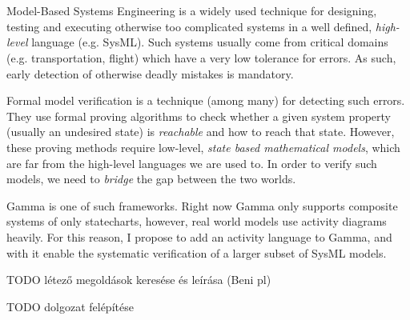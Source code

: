 \chapter{\bevezetes}

Model-Based Systems Engineering is a widely used technique for designing, testing and executing otherwise too complicated systems in a well defined, \emph{high-level} language (e.g. SysML). Such systems usually come from critical domains (e.g. transportation, flight) which have a very low tolerance for errors. As such, early detection of otherwise deadly mistakes is mandatory.

Formal model verification is a technique (among many) for detecting such errors. They use formal proving algorithms to check whether a given system property (usually an undesired state) is \emph{reachable} and how to reach that state. However, these proving methods require low-level, \emph{state based mathematical models}, which are far from the high-level languages we are used to. In order to verify such models, we need to \emph{bridge} the gap between the two worlds.

Gamma is one of such frameworks. Right now Gamma only supports composite systems of only statecharts, however, real world models use activity diagrams heavily. For this reason, I propose to add an activity language to Gamma, and with it enable the systematic verification of a larger subset of SysML models.

TODO létező megoldások keresése és leírása (Beni pl)

TODO dolgozat felépítése
